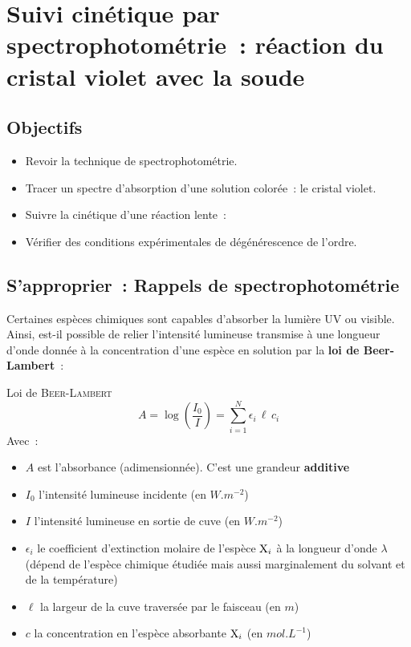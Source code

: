 \documentclass[a4paper, 11pt, final, garamond]{book}
\begin{document}
\setcounter{chapter}{9}

\chapter{Suivi cin\'etique par spectrophotom\'etrie~: r\'eaction du cristal
violet avec la soude}

\section{Objectifs}

\begin{itemize}
    \item Revoir la technique de spectrophotométrie.
    \item Tracer un spectre d'absorption d'une solution colorée~: le cristal
        violet.
    \item Suivre la cinétique d'une réaction lente~: 
    \item Vérifier des conditions expérimentales de dégénérescence de l'ordre.
\end{itemize}

\section{S'approprier~: Rappels de spectrophotométrie}

Certaines espèces chimiques sont capables d'absorber la lumière UV ou visible.
Ainsi, est-il possible de relier l'intensité lumineuse transmise à une longueur
d'onde donnée à la concentration d'une espèce en solution par la \textbf{loi de
Beer-Lambert}~:
\begin{rprop}{Loi de \textsc{Beer-Lambert}}
    \[\boxed{A = \log\left(\frac{I_0}{I}\right) = \sum_{i=1}^{N}\epsilon_i \,
    \ell \, c_i}\]
    Avec~:
    \begin{itemize}
        \item $A$ est l'absorbance (adimensionnée). C'est une grandeur
            \textbf{additive}
        \item $I_0$ l'intensité lumineuse incidente (en $\si{W.m^{-2}}$)
        \item $I$ l'intensité lumineuse en sortie de cuve (en $\si{W.m^{-2}}$)
        \item $\epsilon_i$ le coefficient d'extinction molaire de l'espèce ${\rm
            X}_i$ à la longueur d'onde $\lambda$ (dépend de l'espèce chimique
            étudiée mais aussi marginalement du solvant et de la température)
        \item $\ell$ la largeur de la cuve traversée par le faisceau (en $\si{m}$)
        \item $c$ la concentration en l'espèce absorbante ${\rm X}_i$ (en
            $\si{mol.L^{-1}}$)
    \end{itemize}
\end{rprop}
\end{document}
